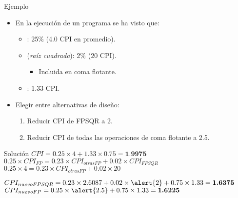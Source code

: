 \begin{frame}[t]{Ejemplo}
\begin{itemize}
  \item En la ejecución de un programa se ha visto que:
    \begin{itemize}
      \item {}: 25\% (4.0 CPI en promedio).
      \item {} (\emph{raíz cuadrada}): 2\% (20 CPI).
        \begin{itemize}
          \item \alert{Incluida en coma flotante.}
        \end{itemize}
      \item {}: 1.33 CPI.
    \end{itemize}
  \item Elegir entre alternativas de diseño:
    \begin{enumerate}[a]
      \item Reducir CPI de FPSQR a 2.
      \item Reducir CPI de todas las operaciones de coma flotante a 2.5.
    \end{enumerate}
\end{itemize}
\end{frame}

\begin{frame}[t]{Solución}
\begin{math}
CPI = 0.25 \times 4 + 1.33 \times 0.75 = \textbf{1.9975}
\end{math}
\begin{math}
0.25 \times CPI_{FP} = 0.23 \times CPI_{otrasFP} + 0.02 \times CPI_{FPSQR}
\end{math}
\pause
\begin{math}
0.25 \times 4 = 0.23 \times CPI_{otrasFP} + 0.02 \times 20
\end{math}

\begin{math}
CPI_{nuevoFPSQR} = 0.23 \times 2.6087 + 0.02 \times \alert{2} + 0.75 \times 1.33 = \textbf{1.6375}
\end{math}
\pause
\begin{math}
CPI_{nuevoFP} = 0.25 \times \alert{2.5} + 0.75 \times 1.33 = \textbf{1.6225}
\end{math}
\end{frame}
